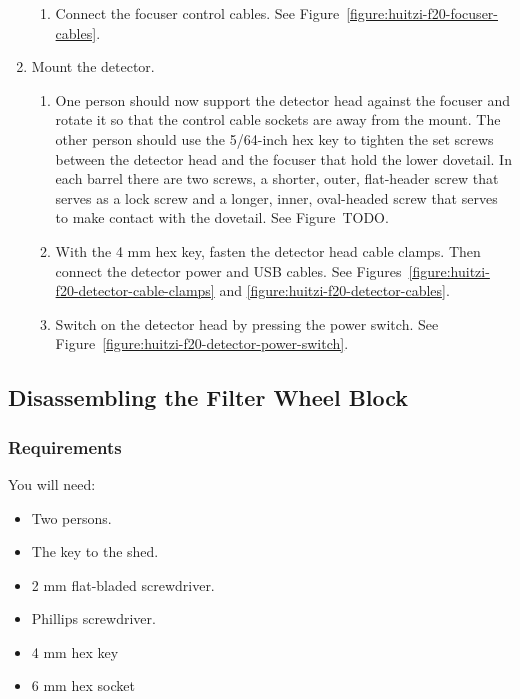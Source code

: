 \begin{enumerate}
\begin{enumerate}
  \item Connect the focuser control cables. See Figure~\ref{figure:huitzi-f20-focuser-cables}.
  
\end{enumerate}


\item Mount the detector.

\begin{enumerate}    

  \item One person should now support the detector head against the focuser and rotate it so that the control cable sockets are away from the mount. The other person should use the 5/64-inch hex key to tighten the set screws between the detector head and the focuser that hold the lower dovetail. In each barrel there are two screws, a shorter, outer, flat-header screw that serves as a lock screw and a longer, inner, oval-headed screw that serves to make contact with the dovetail. See Figure~TODO.

  \item With the 4 mm hex key, fasten the detector head cable clamps. Then connect the detector power and USB cables. See Figures~\ref{figure:huitzi-f20-detector-cable-clamps} and \ref{figure:huitzi-f20-detector-cables}.

  \item Switch on the detector head by pressing the power switch. See Figure~\ref{figure:huitzi-f20-detector-power-switch}.  

\end{enumerate}

\end{enumerate}

\subsection{Disassembling the Filter Wheel Block}

\subsubsection{Requirements}

You will need:

\begin{itemize}
    \item Two persons.
    \item The key to the shed.
    \item 2 mm flat-bladed screwdriver.
    \item Phillips screwdriver.
    \item 4 mm hex key
    \item 6 mm hex socket
\end{itemize}

